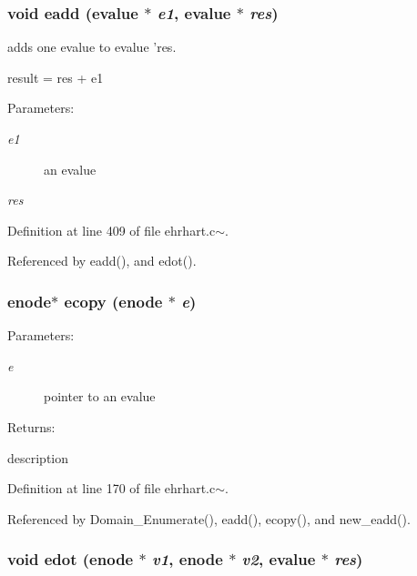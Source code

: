 \subsubsection{\setlength{\rightskip}{0pt plus 5cm}void eadd (evalue $\ast$ {\em e1}, evalue $\ast$ {\em res})}\label{ehrhart_8c~_a15}


adds one evalue to evalue 'res.

result = res + e1\begin{Desc}
\item[Parameters: ]\par
\begin{description}
\item[{\em 
e1}]an evalue  \item[{\em 
res}]\end{description}
\end{Desc}


Definition at line 409 of file ehrhart.c$\sim$.

Referenced by eadd(), and edot().

\subsubsection{\setlength{\rightskip}{0pt plus 5cm}enode$\ast$ ecopy (enode $\ast$ {\em e})}\label{ehrhart_8c~_a9}


\begin{Desc}
\item[Parameters: ]\par
\begin{description}
\item[{\em 
e}]pointer to an evalue  \end{description}
\end{Desc}
\begin{Desc}
\item[Returns: ]\par
description \end{Desc}


Definition at line 170 of file ehrhart.c$\sim$.

Referenced by Domain\_\-Enumerate(), eadd(), ecopy(), and new\_\-eadd().

\subsubsection{\setlength{\rightskip}{0pt plus 5cm}void edot (enode $\ast$ {\em v1}, enode $\ast$ {\em v2}, evalue $\ast$ {\em res})}\label{ehrhart_8c~_a16}


